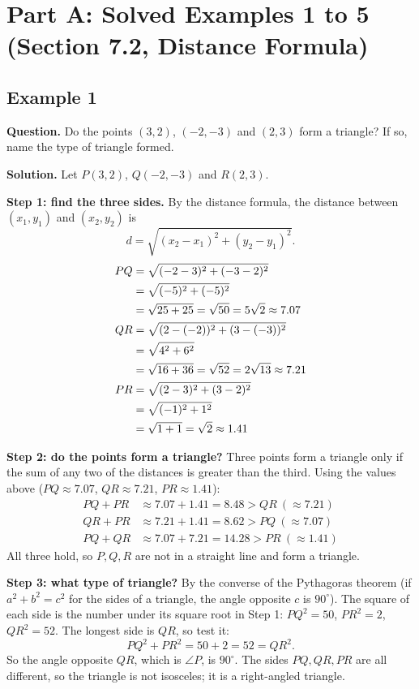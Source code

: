 \section*{Part A: Solved Examples 1 to 5 (Section 7.2, Distance Formula)}

\subsection*{Example 1}
\textbf{Question.} Do the points $(3,2)$, $(-2,-3)$ and $(2,3)$ form a triangle? If so, name the type of triangle formed.

\textbf{Solution.} Let $P(3,2)$, $Q(-2,-3)$ and $R(2,3)$.

\textbf{Step 1: find the three sides.} By the distance formula, the distance between $(x_1,y_1)$ and $(x_2,y_2)$ is
\[d=\sqrt{(x_2-x_1)^2+(y_2-y_1)^2}.\]
\distnote
\begin{align*}
\dist{PQ}{3}{2}{-2}{-3}{5\sqrt2\approx 7.07}\\
\dist{QR}{-2}{-3}{2}{3}{2\sqrt{13}\approx 7.21}\\
\distn{PR}{3}{2}{2}{3}\approx 1.41
\end{align*}

\textbf{Step 2: do the points form a triangle?} Three points form a triangle only if the sum of any two of the distances is greater than the third. Using the values above ($PQ\approx7.07$, $QR\approx7.21$, $PR\approx1.41$):
\begin{align*}
PQ+PR&\approx 7.07+1.41=8.48>QR\ (\approx7.21)\\
QR+PR&\approx 7.21+1.41=8.62>PQ\ (\approx7.07)\\
PQ+QR&\approx 7.07+7.21=14.28>PR\ (\approx1.41)
\end{align*}
All three hold, so $P,Q,R$ are not in a straight line and form a triangle.

\textbf{Step 3: what type of triangle?} By the converse of the Pythagoras theorem (if $a^2+b^2=c^2$ for the sides of a triangle, the angle opposite $c$ is $90^\circ$). The square of each side is the number under its square root in Step 1: $PQ^2=50$, $PR^2=2$, $QR^2=52$. The longest side is $QR$, so test it:
\[
PQ^2+PR^2=50+2=52=QR^2 .
\]
So the angle opposite $QR$, which is $\angle P$, is $90^\circ$. The sides $PQ,QR,PR$ are all different, so the triangle is not isosceles; it is a right-angled triangle.

